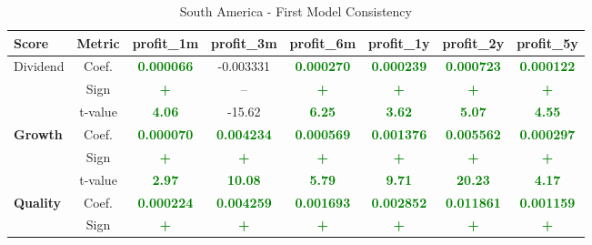 \documentclass[11pt,english,a4paper,hidelinks]{book}
\begin{document}
\begin{table}[H]
    \centering
    \caption{South America - First Model Consistency}
    \begin{tabular}{lccccccc}
        \toprule
        \textbf{Score} & \textbf{Metric} & \textbf{profit\_1m} & \textbf{profit\_3m} & \textbf{profit\_6m} & \textbf{profit\_1y} & \textbf{profit\_2y} & \textbf{profit\_5y} \\
        \midrule
        \multirow{3}{*}{Dividend} 
            & Coef. & \textbf{\textcolor{green}{0.000066}} & -0.003331 & \textbf{\textcolor{green}{0.000270}} & \textbf{\textcolor{green}{0.000239}} & \textbf{\textcolor{green}{0.000723}} & \textbf{\textcolor{green}{0.000122}} \\
            & Sign & \textbf{\textcolor{green}{+}} & – & \textbf{\textcolor{green}{+}} & \textbf{\textcolor{green}{+}} & \textbf{\textcolor{green}{+}} & \textbf{\textcolor{green}{+}} \\
            & t-value & \textbf{\textcolor{green}{4.06}} & -15.62 & \textbf{\textcolor{green}{6.25}} & \textbf{\textcolor{green}{3.62}} & \textbf{\textcolor{green}{5.07}} & \textbf{\textcolor{green}{4.55}} \\
        \midrule
        \multirow{3}{*}{\textbf{Growth}} 
            & Coef. & \textbf{\textcolor{green}{0.000070}} & \textbf{\textcolor{green}{0.004234}} & \textbf{\textcolor{green}{0.000569}} & \textbf{\textcolor{green}{0.001376}} & \textbf{\textcolor{green}{0.005562}} & \textbf{\textcolor{green}{0.000297}} \\
            & Sign & \textbf{\textcolor{green}{+}} & \textbf{\textcolor{green}{+}} & \textbf{\textcolor{green}{+}} & \textbf{\textcolor{green}{+}} & \textbf{\textcolor{green}{+}} & \textbf{\textcolor{green}{+}} \\
            & t-value & \textbf{\textcolor{green}{2.97}} & \textbf{\textcolor{green}{10.08}} & \textbf{\textcolor{green}{5.79}} & \textbf{\textcolor{green}{9.71}} & \textbf{\textcolor{green}{20.23}} & \textbf{\textcolor{green}{4.17}} \\
        \midrule
        \multirow{3}{*}{\textbf{Quality}} 
            & Coef. & \textbf{\textcolor{green}{0.000224}} & \textbf{\textcolor{green}{0.004259}} & \textbf{\textcolor{green}{0.001693}} & \textbf{\textcolor{green}{0.002852}} & \textbf{\textcolor{green}{0.011861}} & \textbf{\textcolor{green}{0.001159}} \\
            & Sign & \textbf{\textcolor{green}{+}} & \textbf{\textcolor{green}{+}} & \textbf{\textcolor{green}{+}} & \textbf{\textcolor{green}{+}} & \textbf{\textcolor{green}{+}} & \textbf{\textcolor{green}{+}} \\

\end{tabular}
\end{table}
\end{document}
